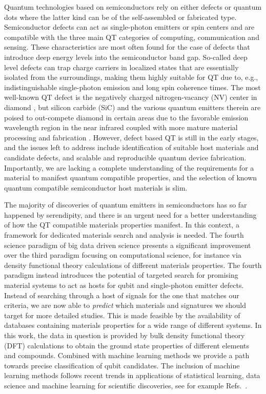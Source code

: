 \documentclass[superscriptaddress,unsortedaddress,
 amsmath,amssymb,
 aps,
]{revtex4-2}
\begin{document}
Quantum technologies based on semiconductors rely on either defects or quantum dots where the latter kind can be of the self-assembled or fabricated type. 
Semiconductor defects can act as single-photon emitters or spin centers and are compatible with the three main QT categories of computing, communication and sensing.  
These characteristics are most often found for the case of defects that introduce deep energy levels into the semiconductor band gap. So-called deep level defects can trap charge carriers in localized states that are essentially isolated from the surroundings, making them highly suitable for QT due to, e.g., indistinguishable single-photon emission and long spin coherence times. 
The most well-known QT defect is the negatively charged nitrogen-vacancy (NV) center in diamond \cite{Doherty_2013}, but silicon carbide (SiC) and the various quantum emitters therein are poised to out-compete diamond in certain areas due to the favorable emission wavelength region in the near infrared coupled with more mature material processing and fabrication \cite{Bathen2021}. 
However, defect based QT is still in the early stages, and the issues left to address include identification of suitable host materials and candidate defects, and scalable and reproducible quantum device fabrication. 
Importantly, we are lacking a complete understanding of the requirements for a material to manifest quantum compatible properties,  
and the selection of known quantum compatible semiconductor host materials is slim. 

The majority of discoveries of quantum emitters in semiconductors has so far happened by serendipity, and there is an urgent need for 
a better understanding of how the QT compatible materials properties manifest. 
In this context, a framework for dedicated materials search and analysis is needed. 
The fourth science paradigm of big data driven science presents a significant improvement over the third paradigm focusing on computational science, for instance via density functional theory calculations of different materials properties. The fourth paradigm instead introduces the potential of targeted search for promising material systems to act as hosts for qubit and single-photon emitter defects.  
Instead of searching through a host of signals for the one that matches our criteria, we are now able to \textit{predict} which materials and signatures we should target for more detailed studies. 
This is made feasible by the availability of databases containing materials properties for a wide range of different systems. In this work, the data in question is provided by bulk density functional theory (DFT) calculations to obtain the ground state properties of different elements and compounds. Combined with machine learning methods we provide a path towards precise classification of qubit candidates. The inclusion of machine learning methods follows recent trends in applications of statistical learning, data science and machine learning for scientific discoveries, see for example Refs.~\cite{deiana2021,Carleo2019}.
\end{document}
